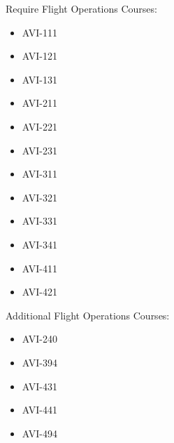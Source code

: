 \documentclass[
  letterpaper,
]{scrbook}
\providecommand{\tightlist}{%
  \setlength{\itemsep}{0pt}\setlength{\parskip}{0pt}}
\begin{document}
Require Flight Operations Courses:

\begin{itemize}
\tightlist
\item
  AVI-111
\item
  AVI-121
\item
  AVI-131
\item
  AVI-211
\item
  AVI-221
\item
  AVI-231
\item
  AVI-311
\item
  AVI-321
\item
  AVI-331
\item
  AVI-341
\item
  AVI-411
\item
  AVI-421
\end{itemize}

Additional Flight Operations Courses:

\begin{itemize}
\tightlist
\item
  AVI-240
\item
  AVI-394
\item
  AVI-431
\item
  AVI-441
\item
  AVI-494
\end{itemize}
\end{document}
